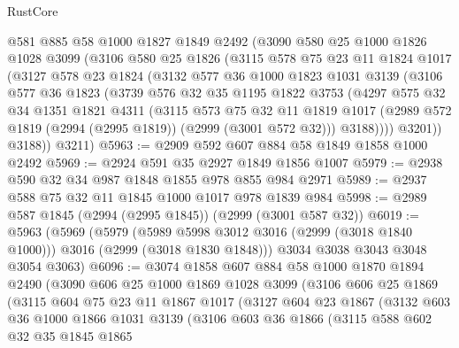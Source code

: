 \begin{lexlean}{RustCore}
\begin{coremodule}
    @581
    @885
    @58
    @1000
    @1827
    @1849
    @2492
    (@3090
      @580
      @25
      @1000
      @1826
      @1028
      @3099
      (@3106
        @580
        @25
        @1826
        (@3115
          @578
          @75
          @23
          @11
          @1824
          @1017
          (@3127
            @578
            @23
            @1824
            (@3132
              @577
              @36
              @1000
              @1823
              @1031
              @3139
              (@3106
                @577
                @36
                @1823
                (@3739
                  @576
                  @32
                  @35
                  @1195
                  @1822
                  @3753
                  (@4297
                    @575
                    @32
                    @34
                    @1351
                    @1821
                    @4311
                    (@3115
                      @573
                      @75
                      @32
                      @11
                      @1819
                      @1017
                      (@2989 @572 @1819 (@2994 (@2995 @1819)) (@2999 (@3001 @572 @32)))
                      @3188))))
              @3201))
          @3188))
      @3211)
@5963 := @2909 @592 @607 @884 @58 @1849 @1858 @1000 @2492
@5969 := @2924 @591 @35 @2927 @1849 @1856 @1007
@5979 := @2938 @590 @32 @34 @987 @1848 @1855 @978 @855 @984 @2971
@5989 := @2937 @588 @75 @32 @11 @1845 @1000 @1017 @978 @1839 @984
@5998 := @2989 @587 @1845 (@2994 (@2995 @1845)) (@2999 (@3001 @587 @32))
@6019 := @5963
    (@5969
      (@5979
        (@5989 @5998 @3012 @3016 (@2999 (@3018 @1840 @1000)))
        @3016
        (@2999 (@3018 @1830 @1848)))
      @3034
      @3038
      @3043
      @3048
      @3054
      @3063)
@6096 := @3074
    @1858
    @607
    @884
    @58
    @1000
    @1870
    @1894
    @2490
    (@3090
      @606
      @25
      @1000
      @1869
      @1028
      @3099
      (@3106
        @606
        @25
        @1869
        (@3115
          @604
          @75
          @23
          @11
          @1867
          @1017
          (@3127
            @604
            @23
            @1867
            (@3132
              @603
              @36
              @1000
              @1866
              @1031
              @3139
              (@3106
                @603
                @36
                @1866
                (@3115
                  @588
                  @602
                  @32
                  @35
                  @1845
                  @1865

\end{coremodule}
\end{lexlean}
